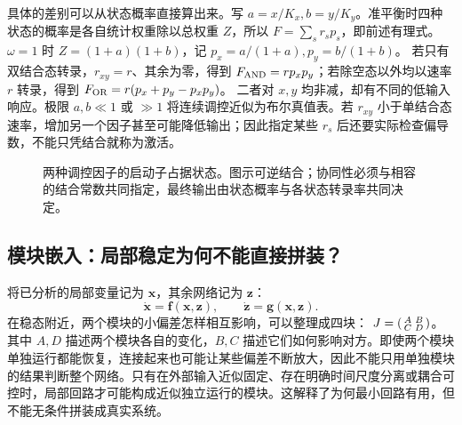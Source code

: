 \documentclass[11pt,a4paper,UTF8,fontset=fandol]{ctexart}
\begin{document}
具体的差别可以从状态概率直接算出来。写 $a=x/K_x,b=y/K_y$。准平衡时四种状态的概率是各自统计权重除以总权重 $Z$，所以 $F=\sum_s r_s p_s$，即前述有理式。$\omega=1$ 时 $Z=(1+a)(1+b)$，记 $p_x=a/(1+a),p_y=b/(1+b)$。
若只有双结合态转录，$r_{xy}=r$、其余为零，得到
$F_{\rm AND}=rp_xp_y$；若除空态以外均以速率 $r$ 转录，得到
$F_{\rm OR}=r(p_x+p_y-p_xp_y)$。
二者对 $x,y$ 均非减，却有不同的低输入响应。极限 $a,b\ll1$ 或 $\gg1$ 将连续调控近似为布尔真值表。若 $r_{xy}$ 小于单结合态速率，增加另一个因子甚至可能降低输出；因此指定某些 $r_s$ 后还要实际检查偏导数，不能只凭结合就称为激活。
\begin{figure}[H]\centering
{}
\caption{两种调控因子的启动子占据状态。图示可逆结合；协同性必须与相容的结合常数共同指定，最终输出由状态概率与各状态转录率共同决定。}
\end{figure}

\subsection{模块嵌入：局部稳定为何不能直接拼装？}
将已分析的局部变量记为 $\bm x$，其余网络记为 $\bm z$：
\begin{equation}\dot{\bm x}=\bm f(\bm x,\bm z),\qquad\dot{\bm z}=\bm g(\bm x,\bm z).\end{equation}
在稳态附近，两个模块的小偏差怎样相互影响，可以整理成四块： $J=\begin{psmallmatrix}A&B\\C&D\end{psmallmatrix}$。其中 $A,D$ 描述两个模块各自的变化，$B,C$ 描述它们如何影响对方。即使两个模块单独运行都能恢复，连接起来也可能让某些偏差不断放大，因此不能只用单独模块的结果判断整个网络。只有在外部输入近似固定、存在明确时间尺度分离或耦合可控时，局部回路才可能构成近似独立运行的模块。这解释了为何最小回路有用，但不能无条件拼装成真实系统。
\end{document}
